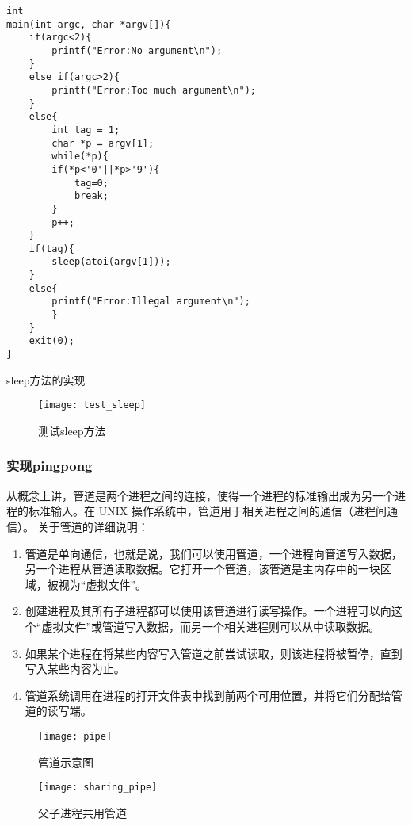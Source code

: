 \begin{listing}[!htb]
	\begin{verbatim}
int
main(int argc, char *argv[]){
    if(argc<2){
        printf("Error:No argument\n");
    }
    else if(argc>2){
        printf("Error:Too much argument\n");
    }
    else{
        int tag = 1;
        char *p = argv[1];
        while(*p){
        if(*p<'0'||*p>'9'){
            tag=0;
            break;
        }
        p++;
    }
    if(tag){
        sleep(atoi(argv[1]));
    }
    else{
        printf("Error:Illegal argument\n");
        }
    }
    exit(0);
}
	\end{verbatim}
	\caption{sleep方法的实现}\label{lst:sleep}
\end{listing}

\begin{figure}[!htb]
	\centering
	\texttt{[image: test\_sleep]}
	\caption{测试sleep方法}
	\label{fig:test_sleep}
\end{figure}

\subsubsection{实现pingpong}

从概念上讲，管道是两个进程之间的连接，使得一个进程的标准输出成为另一个进程的标准输入。在 UNIX 操作系统中，管道用于相关进程之间的通信（进程间通信）。
关于管道的详细说明：
\begin{enumerate}
	\item 管道是单向通信，也就是说，我们可以使用管道，一个进程向管道写入数据，另一个进程从管道读取数据。它打开一个管道，该管道是主内存中的一块区域，被视为“虚拟文件”。
	\item 创建进程及其所有子进程都可以使用该管道进行读写操作。一个进程可以向这个“虚拟文件”或管道写入数据，而另一个相关进程则可以从中读取数据。
	\item 如果某个进程在将某些内容写入管道之前尝试读取，则该进程将被暂停，直到写入某些内容为止。
	\item 管道系统调用在进程的打开文件表中找到前两个可用位置，并将它们分配给管道的读写端。
\end{enumerate}

\begin{figure}[!htb]
	\begin{minipage}{0.4\textwidth}
		\centering
		\texttt{[image: pipe]}
		\caption{管道示意图}
		\label{fig:pipe}
	\end{minipage}\hfill
	\begin{minipage}{0.4\textwidth}
		\centering
		\texttt{[image: sharing\_pipe]}
		\caption{父子进程共用管道}
		\label{fig:sharing_pipe}
	\end{minipage}
\end{figure}

